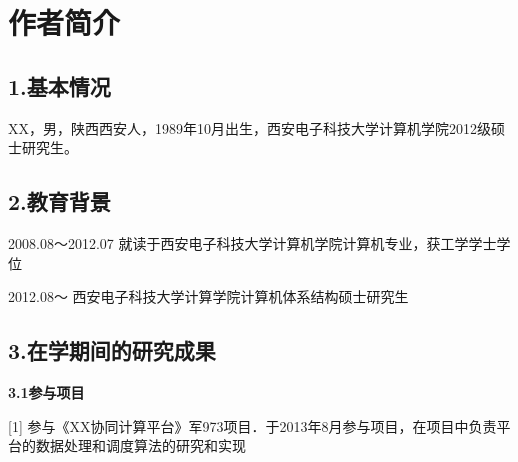 
\chapter*{作者简介}

\section*{\textbf{1.基本情况}}
XX，男，陕西西安人，1989年10月出生，西安电子科技大学计算机学院2012级硕士研究生。

\section*{\textbf{2.教育背景}}
2008.08～2012.07  就读于西安电子科技大学计算机学院计算机专业，获工学学士学位

2012.08～        西安电子科技大学计算学院计算机体系结构硕士研究生

\section*{\textbf{3.在学期间的研究成果}}

\textbf{3.1参与项目}

[1] 参与《XX协同计算平台》军973项目．于2013年8月参与项目，在项目中负责平台的数据处理和调度算法的研究和实现


